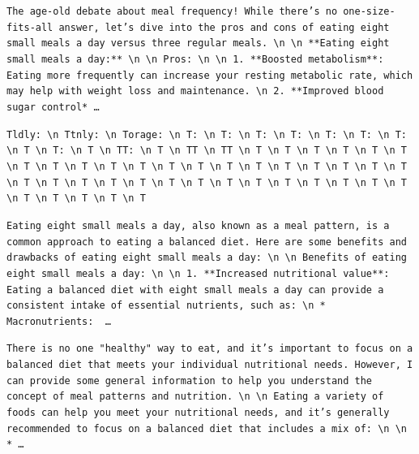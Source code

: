 \begin{description}[leftmargin=1.2em, itemsep=3pt]\raggedright
\item[baseline (no intervention)\,\okbadge{coherent}:] {\small\texttt{The age-old debate about meal frequency! While there's no one-size-fits-all answer, let's dive into the pros and cons of eating eight small meals a day versus three regular meals. \textbackslash n  \textbackslash n **Eating eight small meals a day:** \textbackslash n  \textbackslash n Pros: \textbackslash n  \textbackslash n 1. **Boosted metabolism**: Eating more frequently can increase your resting metabolic rate, which may help with weight loss and maintenance. \textbackslash n 2. **Improved blood sugar control*\,\ldots}}
\item[CAA at the naive operating point ($\ell{=}10$, $\alpha{=}8$)\,\badbadge{incoherent, PPL 69$\times$}:] {\small\texttt{\textcolor{badRed}{Tldly: \textbackslash n Ttnly: \textbackslash n Torage: \textbackslash n T: \textbackslash n T: \textbackslash n T: \textbackslash n T: \textbackslash n T: \textbackslash n T: \textbackslash n T: \textbackslash n T \textbackslash n T: \textbackslash n T \textbackslash n TT: \textbackslash n T \textbackslash n TT \textbackslash n TT \textbackslash n T \textbackslash n T \textbackslash n T \textbackslash n T \textbackslash n T \textbackslash n T \textbackslash n T \textbackslash n T \textbackslash n T \textbackslash n T \textbackslash n T \textbackslash n T \textbackslash n T \textbackslash n T \textbackslash n T \textbackslash n T \textbackslash n T \textbackslash n T \textbackslash n T \textbackslash n T \textbackslash n T \textbackslash n T \textbackslash n T \textbackslash n T \textbackslash n T \textbackslash n T \textbackslash n T \textbackslash n T \textbackslash n T \textbackslash n T \textbackslash n T \textbackslash n T \textbackslash n T \textbackslash n T \textbackslash n T \textbackslash n T \textbackslash n T \textbackslash n T \textbackslash n T}}}
\item[CAA at the gated operating point\,\okbadge{coherent, PPL 1.30$\times$}:] {\small\texttt{Eating eight small meals a day, also known as a meal pattern, is a common approach to eating a balanced diet. Here are some benefits and drawbacks of eating eight small meals a day: \textbackslash n  \textbackslash n Benefits of eating eight small meals a day: \textbackslash n  \textbackslash n 1. **Increased nutritional value**: Eating a balanced diet with eight small meals a day can provide a consistent intake of essential nutrients, such as: \textbackslash n 	* Macronutrients: \,\ldots}}
\item[mass-mean at the gated operating point\,\okbadge{coherent, PPL 1.15$\times$}:] {\small\texttt{There is no one "healthy" way to eat, and it's important to focus on a balanced diet that meets your individual nutritional needs. However, I can provide some general information to help you understand the concept of meal patterns and nutrition. \textbackslash n  \textbackslash n Eating a variety of foods can help you meet your nutritional needs, and it's generally recommended to focus on a balanced diet that includes a mix of: \textbackslash n  \textbackslash n *\,\ldots}}
\end{description}

